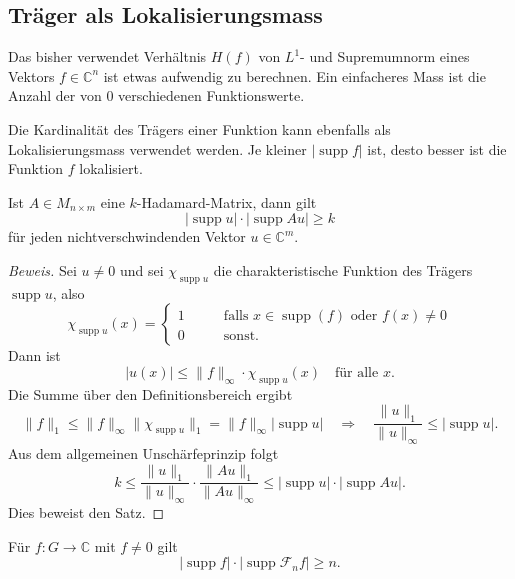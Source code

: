 %
%
\subsection{Träger als Lokalisierungsmass}
Das bisher verwendet Verhältnis $H(f)$ von $L^1$- und Supremumnorm
eines Vektors $f\in\mathbb{C}^n$ ist etwas aufwendig zu berechnen.
Ein einfacheres Mass ist die Anzahl der von $0$ verschiedenen
Funktionswerte.



Die Kardinalität des Trägers einer Funktion kann ebenfalls als
Lokalisierungsmass verwendet werden.
Je kleiner $|\operatorname{supp}f|$ ist, desto besser ist die
Funktion $f$ lokalisiert.

\begin{satz}
\label{buch:diskret:unschaerfe:satz:supportsize}
Ist $A\in M_{n\times m}$ eine $k$-Hadamard-Matrix, dann gilt
\begin{equation}
|\operatorname{supp}u|
\cdot
|\operatorname{supp}Au|
\ge
k
\end{equation}
für jeden nichtverschwindenden Vektor $u\in\mathbb{C}^m$.
\end{satz}

\begin{proof}[Beweis]
Sei $u\ne 0$ und sei $\chi_{\operatorname{supp}u}$ die charakteristische
Funktion des Trägers $\operatorname{supp}u$, also
\[
\chi_{\operatorname{supp}u}(x)
=
\begin{cases}
1&\qquad\text{falls $x\in\operatorname{supp}(f)$ oder $f(x)\ne 0$}\\
0&\qquad\text{sonst.}
\end{cases}
\]
Dann ist
\[
|u(x)|
\le
\|f\|_\infty\cdot \chi_{\operatorname{supp}u}(x)
\quad
\text{für alle $x$.}
\]
Die Summe über den Definitionsbereich ergibt
\[
\|f\|_1
\le
\|f\|_\infty \|\chi_{\operatorname{supp}u}\|_1
=
\|f\|_\infty |\operatorname{supp}u|
\quad\Rightarrow\quad
\frac{\|u\|_1}{\|u\|_\infty} \le |\operatorname{supp}u|.
\]
Aus dem allgemeinen Unschärfeprinzip folgt
\[
k
\le
\frac{\|u\|_1}{\|u\|_\infty}
\cdot
\frac{\|Au\|_1}{\|Au\|_\infty}
\le
|\operatorname{supp}u|
\cdot
|\operatorname{supp}Au|.
\]
Dies beweist den Satz.
\end{proof}

\begin{satz}
\label{buch:diskret:unschaerfe:satz:donoho-stark}
Für $f\colon G\to\mathbb{C}$ mit $f\ne 0$ gilt
\[
|\operatorname{supp}f|
\cdot
|\operatorname{supp}\mathscr{F}_nf|
\ge n.
\]
\end{satz}

